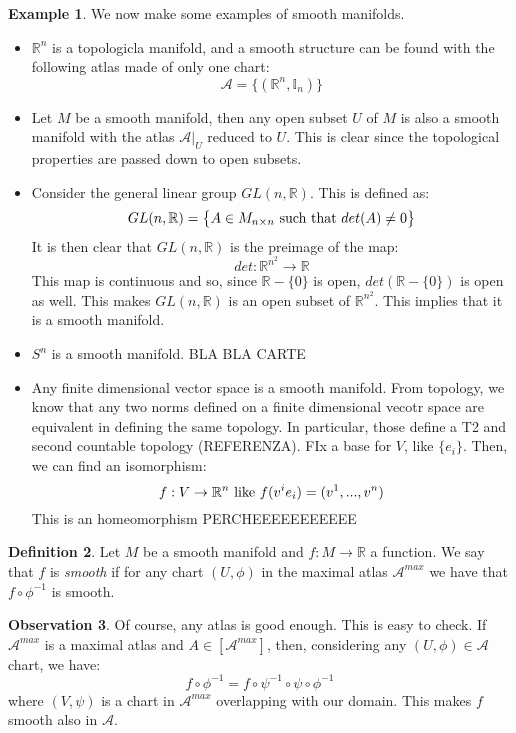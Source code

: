 \documentclass[12pt,a4paper]{report}
\theoremstyle{definition}
\newtheorem{Def}{Definition}[chapter]
\theoremstyle{Theorem}
\theoremstyle{definition}
\newtheorem{Ex}[Def]{Example}
\theoremstyle{definition}
\newtheorem{Obs}[Def]{Observation}
\begin{document}
		\begin{Ex}
			We now make some examples of smooth manifolds.
			\begin{itemize}
				\item $\mathbb{R}^n$ is a topologicla manifold, and a smooth structure can be found with the following atlas made of only one chart:
				$$\mathcal{A}=\{(\mathbb{R}^n,\mathbb{I}_n)\}$$
				\item Let $M$ be a smooth manifold, then any open subset $U$ of $M$ is also a smooth manifold with the atlas $\mathcal{A}\big|_U$ reduced to $U$. This is clear since the topological properties are passed down to open subsets.
				\item Consider the general linear group $GL(n,\mathbb{R})$. This is defined as:
				$$GL(n,\mathbb{R})=\big\{A\in M_{n\times n}\hbox{ such that }det(A)\neq 0\big\}$$
				It is then clear that $GL(n,\mathbb{R})$ is the preimage of the map:
				$$det:\mathbb{R}^{n^2}\longrightarrow \mathbb{R}$$ 
				This map is continuous and so, since $\mathbb{R}-\{0\}$ is open, $det(\mathbb{R}-\{0\})$ is open as well. This makes $GL(n,\mathbb{R})$ is an open subset of $\mathbb{R}^{n^2}$. This implies that it is a smooth manifold.
				\item $S^n$ is a smooth manifold. BLA BLA CARTE
				\item Any finite dimensional vector space is a smooth manifold. From topology, we know that any two norms defined on a finite dimensional vecotr space are equivalent in defining the same topology. In particular, those define a T2 and second countable topology (REFERENZA). FIx a base for $V$, like $\{e_i\}$. Then, we can find an isomorphism:
				$$f:V\rightarrow \mathbb{R}^n\hbox{ like }f(v^ie_i)=(v^1,...,v^n)$$
				This is an homeomorphism PERCHEEEEEEEEEEE
			\end{itemize}
		\end{Ex}
		\begin{Def}
			Let $M$ be a smooth manifold and $f:M\rightarrow\mathbb{R}$ a function. We say that $f$ is \textit{smooth} if for any chart $(U,\phi)$ in the maximal atlas $\mathcal{A}^{max}$ we have that
			$f\circ \phi^{-1}$ is smooth.
		\end{Def}
		\begin{Obs}
			Of course, any atlas is good enough. This is easy to check. If $\mathcal{A}^{max}$ is a maximal atlas and $A\in[\mathcal{A}^{max}]$, then, considering any $(U,\phi)\in \mathcal{A}$ chart, we have:
			$$f\circ \phi^{-1}=f\circ \psi^{-1}\circ \psi\circ \phi^{-1}$$
			where $(V,\psi)$ is a chart in $\mathcal{A}^{max}$ overlapping with our domain. This makes $f$ smooth also in $\mathcal{A}$.
		\end{Obs}
\end{document}
